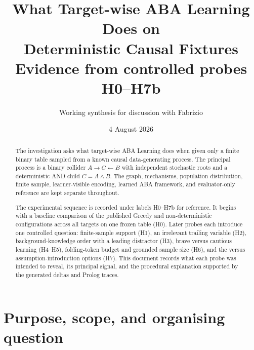\documentclass[11pt]{article}
\title{What Target-wise ABA Learning Does on\\
Deterministic Causal Fixtures\\[0.35em]
\large Evidence from controlled probes H0--H7b}
\author{Working synthesis for discussion with Fabrizio}
\date{4 August 2026}
\DeclareRobustCommand{\code}[1]{\texttt{\detokenize{#1}}}
\begin{document}
\maketitle

\begin{center}
\end{center}

\begin{abstract}
The investigation asks what target-wise ABA Learning does when given only a
finite binary table sampled from a known causal data-generating process. The
principal process is a binary collider \(A\rightarrow C\leftarrow B\) with
independent stochastic roots and a deterministic AND child \(C=A\land B\).
The graph, mechanisms, population distribution, finite sample,
learner-visible encoding, learned ABA framework, and evaluator-only reference
are kept separate throughout.

The experimental sequence is recorded under labels H0--H7b for reference.
It begins with a baseline comparison of the published Greedy and
non-deterministic configurations across all targets on one frozen table
(H0). Later probes each introduce one controlled question: finite-sample
support (H1), an irrelevant trailing variable (H2), background-knowledge
order with a leading distractor (H3), brave versus cautious learning
(H4--H5), folding-token budget and grounded sample size (H6), and the
\code{relto} versus \code{sechk} assumption-introduction options (H7).
This document records what each probe was intended to reveal, its principal
signal, and the procedural explanation supported by the generated deltas and
Prolog traces.
\end{abstract}

\tableofcontents
\newpage

\section{Purpose, scope, and organising question}
\end{document}
